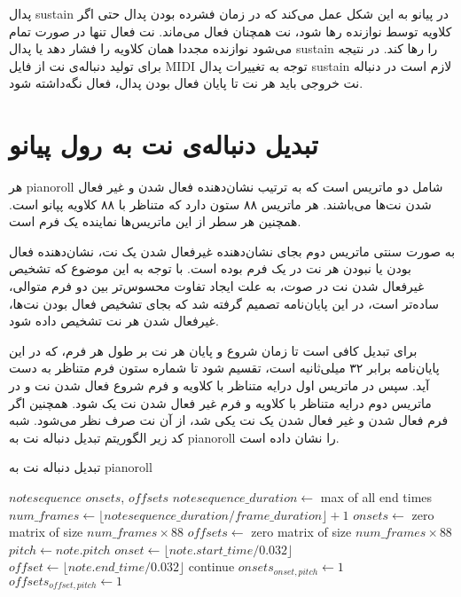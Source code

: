 پدال \gls{sustain} در پیانو به این شکل عمل می‌کند که در زمان فشرده بودن پدال حتی
اگر کلاویه توسط نوازنده رها شود، نت همچنان فعال می‌ماند. نت فعال تنها در صورت
تمام می‌شود نوازنده مجددا همان کلاویه را فشار دهد یا پدال \gls{sustain} را رها
کند. در نتیجه برای تولید دنباله‌ی نت از فایل \gls{MIDI} توجه به تغییرات پدال
\gls{sustain} لازم است در دنباله نت خروجی باید هر نت تا پایان فعال بودن پدال،
فعال نگه‌داشته شود.

\section{تبدیل دنباله‌ی نت به رول پیانو}
هر \gls{pianoroll} شامل دو ماتریس است که به ترتیب نشان‌دهنده فعال شدن و غیر فعال
شدن نت‌ها می‌باشند. هر ماتریس ۸۸ ستون دارد که متناظر با ۸۸ کلاویه پپانو است.
همچنین هر سطر از این ماتریس‌ها نماینده یک فرم است.

به صورت سنتی ماتریس دوم بجای نشان‌دهنده غیرفعال شدن یک نت، نشان‌دهنده فعال بودن
یا نبودن هر نت در یک فرم بوده است. با توجه به این موضوع که تشخیص غیرفعال شدن نت
در صوت، به علت ایجاد تفاوت محسوس‌تر بین دو فرم متوالی، ساده‌تر است، در این
پایان‌نامه تصمیم گرفته شد که بجای تشخیص فعال بودن نت‌ها، غیرفعال شدن هر نت تشخیص
داده شود.

برای تبدیل کافی است تا زمان شروع و پایان هر نت بر طول هر فرم، که در این
پایان‌نامه برابر ۳۲ میلی‌ثانیه است، تقسیم شود تا شماره ستون فرم متناظر به دست
آید. سپس در ماتریس اول درایه متناظر با کلاویه و فرم شروع فعال شدن نت و در ماتریس
دوم درایه متناظر با کلاویه و فرم غیر فعال شدن نت یک شود. همچنین اگر فرم فعال شدن
و غیر فعال شدن یک نت یکی شد، از آن نت صرف نظر می‌شود. شبه کد زیر الگوریتم تبدیل
دنباله نت به \gls{pianoroll} را نشان داده است.

\begin{algorithm}[ht]
\caption{تبدیل دنباله نت به \gls{pianoroll}}
\begin{algorithmic}
\begin{latin}
    \Require $notesequence$
    \Ensure $onsets$, $offsets$
    \State $notesequence\_duration \leftarrow$ max of all end times
    \State $num\_frames \leftarrow \lfloor notesequence\_duration / frame\_duration \rfloor + 1$
    \State $onsets \leftarrow$ zero matrix of size $num\_frames \times 88$
    \State $offsets \leftarrow$ zero matrix of size $num\_frames \times 88$
        \State $pitch \leftarrow note.pitch$
        \State $onset \leftarrow \lfloor note.start\_time / 0.032 \rfloor$
        \State $offset \leftarrow \lfloor note.end\_time / 0.032 \rfloor$
            \State continue
        \EndIf
        \State $onsets_{onset, pitch} \leftarrow 1$
        \State $offsets_{offset, pitch} \leftarrow 1$
    \EndFor
\end{latin}
\end{algorithmic}
\end{algorithm}

